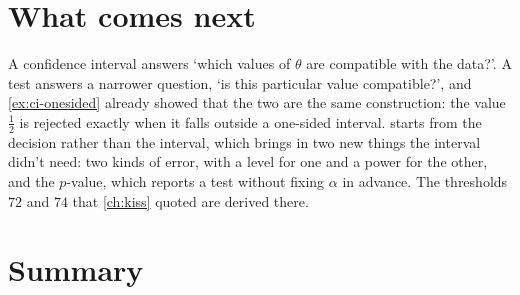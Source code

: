\section{What comes next}
\label{sec:ci-next}

A confidence interval answers `which values of $\theta$ are compatible with the data?'.
A test answers a narrower question, `is this particular value compatible?', and \cref{ex:ci-onesided} already showed that the two are the same construction: the value $\frac12$ is rejected exactly when it falls outside a one-sided interval.
 starts from the decision rather than the interval, which brings in two new things the interval didn't need: two kinds of error, with a level for one and a power for the other, and the $p$-value, which reports a test without fixing $\alpha$ in advance.
The thresholds $72$ and $74$ that \cref{ch:kiss} quoted are derived there.

\section{Summary}
\label{sec:ci-summary}

